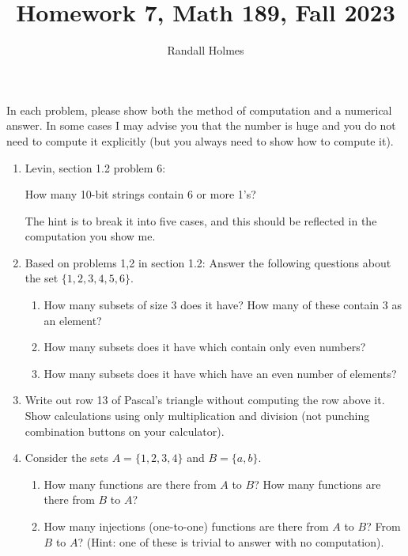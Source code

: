 \documentclass[12pt]{article}
\title{Homework 7, Math 189, Fall 2023}
\author{Randall Holmes}
\begin{document}
\maketitle

In each problem, please show both the method of computation and a numerical answer.  In some cases I may advise you that the number is huge and you do not need to compute it explicitly (but you always need to show how to compute it).

\begin{enumerate}

\item  Levin, section 1.2 problem 6:  

How many 10-bit strings contain 6 or more 1’s?

The hint is to break it into five cases, and this should be reflected in the computation you show me.

\item  Based on problems 1,2 in section 1.2:  Answer the following questions about the set $\{1,2,3,4,5,6\}$.
\begin{enumerate}
\item   How many subsets of size 3 does it have?  How many of these contain 3 as an element?

\item  How many subsets does it have which contain only even numbers? 

\item  How many subsets does it have which have an even number of elements?
\end{enumerate}

\item  Write out row 13 of Pascal's triangle without computing the row above it.  Show calculations using only multiplication and division (not punching combination buttons on your calculator).

\item  Consider the sets $A = \{1,2,3,4\}$ and $B = \{a,b\}$.

\begin{enumerate}

\item  How many functions are there from $A$ to $B$?  How many functions are there from $B$ to $A$?

\item  How many injections (one-to-one) functions are there from $A$ to $B$?  From $B$ to $A$?  (Hint:  one of these is trivial to answer with no computation).


\end{enumerate}
\end{enumerate}
\end{document}
